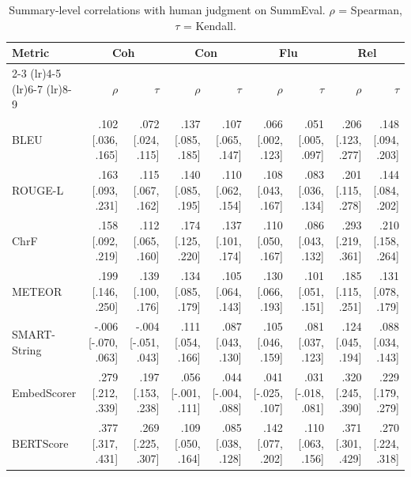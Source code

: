 \begin{table}[t]
\centering
\caption{Summary-level correlations with human judgment on SummEval. $\rho$ = Spearman, $\tau$ = Kendall.}
\label{tab:correlations_summary}
\begin{tabular}{lrrrrrrrr}
\toprule
Metric & \multicolumn{2}{c}{Coh} & \multicolumn{2}{c}{Con} & \multicolumn{2}{c}{Flu} & \multicolumn{2}{c}{Rel} \\
\cmidrule(lr){2-3} \cmidrule(lr){4-5} \cmidrule(lr){6-7} \cmidrule(lr){8-9} 
  & $\rho$ & $\tau$ & $\rho$ & $\tau$ & $\rho$ & $\tau$ & $\rho$ & $\tau$ \\
\midrule
BLEU & .102 {\scriptsize [.036, .165]} & .072 {\scriptsize [.024, .115]} & .137 {\scriptsize [.085, .185]} & .107 {\scriptsize [.065, .147]} & .066 {\scriptsize [.002, .123]} & .051 {\scriptsize [.005, .097]} & .206 {\scriptsize [.123, .277]} & .148 {\scriptsize [.094, .203]} \\
ROUGE-L & .163 {\scriptsize [.093, .231]} & .115 {\scriptsize [.067, .162]} & .140 {\scriptsize [.085, .195]} & .110 {\scriptsize [.062, .154]} & .108 {\scriptsize [.043, .167]} & .083 {\scriptsize [.036, .134]} & .201 {\scriptsize [.115, .278]} & .144 {\scriptsize [.084, .202]} \\
ChrF & .158 {\scriptsize [.092, .219]} & .112 {\scriptsize [.065, .160]} & .174 {\scriptsize [.125, .220]} & .137 {\scriptsize [.101, .174]} & .110 {\scriptsize [.050, .167]} & .086 {\scriptsize [.043, .132]} & .293 {\scriptsize [.219, .361]} & .210 {\scriptsize [.158, .264]} \\
METEOR & .199 {\scriptsize [.146, .250]} & .139 {\scriptsize [.100, .176]} & .134 {\scriptsize [.085, .179]} & .105 {\scriptsize [.064, .143]} & .130 {\scriptsize [.066, .193]} & .101 {\scriptsize [.051, .151]} & .185 {\scriptsize [.115, .251]} & .131 {\scriptsize [.078, .179]} \\
SMART-String & -.006 {\scriptsize [-.070, .063]} & -.004 {\scriptsize [-.051, .043]} & .111 {\scriptsize [.054, .166]} & .087 {\scriptsize [.043, .130]} & .105 {\scriptsize [.046, .159]} & .081 {\scriptsize [.037, .123]} & .124 {\scriptsize [.045, .194]} & .088 {\scriptsize [.034, .143]} \\
EmbedScorer & .279 {\scriptsize [.212, .339]} & .197 {\scriptsize [.153, .238]} & .056 {\scriptsize [-.001, .111]} & .044 {\scriptsize [-.004, .088]} & .041 {\scriptsize [-.025, .107]} & .031 {\scriptsize [-.018, .081]} & .320 {\scriptsize [.245, .390]} & .229 {\scriptsize [.179, .279]} \\
BERTScore & .377 {\scriptsize [.317, .431]} & .269 {\scriptsize [.225, .307]} & .109 {\scriptsize [.050, .164]} & .085 {\scriptsize [.038, .128]} & .142 {\scriptsize [.077, .202]} & .110 {\scriptsize [.063, .156]} & .371 {\scriptsize [.301, .429]} & .270 {\scriptsize [.224, .318]} \\

\end{tabular}
\end{table}
